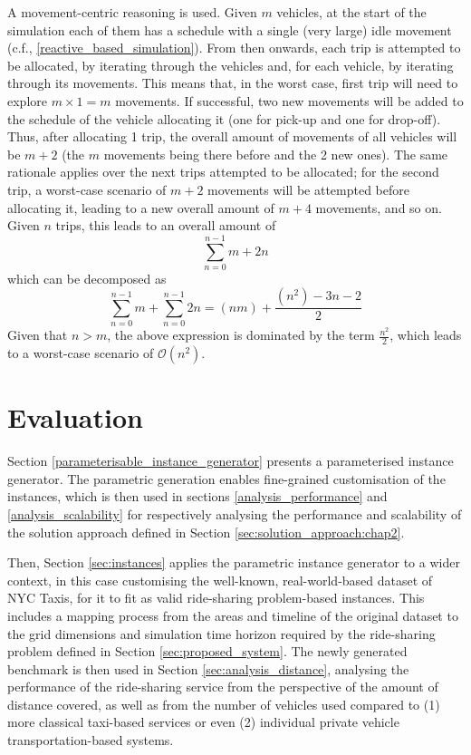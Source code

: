 A movement-centric reasoning is used. Given $m$ vehicles, at the start of the simulation each of them has a schedule with a single (very large) idle movement (c.f., \ref{reactive_based_simulation}). From then onwards, each trip is attempted to be allocated, by iterating through the vehicles and, for each vehicle, by iterating through its movements. This means that, in the worst case, first trip will need to explore $m \times 1 = m$ movements. If successful, two new movements will be added to the schedule of the vehicle allocating it (one for pick-up and one for drop-off). Thus, after allocating 1 trip, the overall amount of movements of all vehicles will be $m + 2$ (the $m$ movements being there before and the 2 new ones). The same rationale applies over the next trips attempted to be allocated; for the second trip, a worst-case scenario of $m + 2$ movements will be attempted before allocating it, leading to a new overall amount of $m + 4$ movements, and so on. Given $n$ trips, this leads to an overall amount of 
\[
\sum_{n=0}^{n-1} m + 2n
\]
which can be decomposed as 
\[
\sum_{n=0}^{n-1} m +  \sum_{n=0}^{n-1} 2n = (n m) + \frac{(n^2) - 3n - 2}{2}
\]
 Given that $n > m$, the above expression is dominated by the term $\frac{n^2}{2}$, which leads to a worst-case scenario of $\mathcal{O}(n^2)$.  


\section{Evaluation}
\label{sec:evaluation}


Section \ref{parameterisable_instance_generator} presents a parameterised instance generator.
The parametric generation enables fine-grained customisation of the instances,  which is then used in sections \ref{analysis_performance} and \ref{analysis_scalability} for respectively analysing the performance and scalability of the solution approach defined in Section \ref{sec:solution_approach:chap2}. 

Then, Section \ref{sec:instances} applies the parametric instance generator to a wider context, in this case customising the well-known, real-world-based dataset of NYC Taxis, for it to fit as valid ride-sharing problem-based instances. This includes a mapping process from the areas and timeline of the original dataset to the grid dimensions and simulation time horizon required by the ride-sharing problem defined in Section \ref{sec:proposed_system}.  The newly generated benchmark is then used in Section \ref{sec:analysis_distance},  analysing the performance of the ride-sharing service from the perspective of the amount of distance covered, as well as from the number of vehicles used compared to (1) more classical taxi-based services or even (2) individual private vehicle transportation-based systems. 

